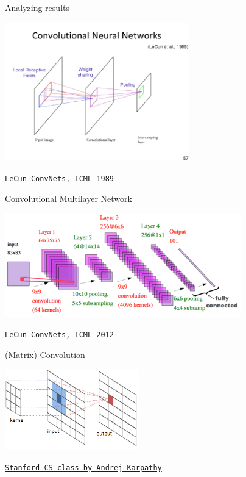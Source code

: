 \documentclass[12pt,t]{beamer}
\begin{document}
\begin{frame}[c]{Analyzing results}

\includegraphics[height=60mm]{Figs/LeCun1989.jpg}

\hfill
{\footnotesize \lolit
\href{http://yann.lecun.com/exdb/publis/pdf/lecun-89e.pdf}{\tt LeCun ConvNets, ICML 1989}
}

\end{frame}

\begin{frame}[c]{Convolutional Multilayer Network}

\includegraphics[height=45mm]{Figs/multilayer.png}

\hfill
{\footnotesize \lolit
{\tt LeCun ConvNets, ICML 2012 }
}

\end{frame}

\begin{frame}[c]{(Matrix) Convolution}

\includegraphics[height=35mm]{Figs/convolution.png}

\hfill
{\footnotesize \lolit
\href{http://cs231n.github.io/convolutional-networks/}{\tt Stanford CS class by Andrej Karpathy}
}

\end{frame}
\end{document}
